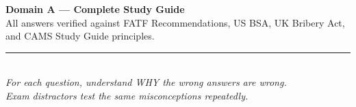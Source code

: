 \documentclass[12pt,aspectratio=169]{beamer}
\begin{document}
	\begin{frame}
		\centering
		\vspace{1.5cm}
		{\fontsize{18}{22}\selectfont \textbf{Domain A — Complete Study Guide}}\\[0.3cm]
		{\fontsize{12}{14}\selectfont All answers verified against FATF Recommendations, US BSA, UK Bribery Act, and CAMS Study Guide principles.}\\[0.3cm]
		\rule{4cm}{0.5pt}\\[0.2cm]
		{\fontsize{9}{11}\selectfont \textit{For each question, understand WHY the wrong answers are wrong.} \\
			\textit{Exam distractors test the same misconceptions repeatedly.}}
		\vspace{0.5cm}
	\end{frame}
	
\end{document}
